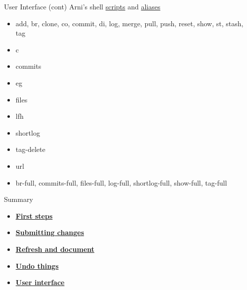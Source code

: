 \documentclass[aspectratio=169]{beamer}
\begin{document}
\begin{frame}{User Interface (cont)}\small
  Arni's shell {\blue\href{https://github.com/arni-magnusson/bin}{scripts}} and
  {\blue
    \href{https://github.com/arni-magnusson/dot/blob/master/.bashrc}{aliases}}
  \begin{itemize}\fns
    \item[] add, br, clone, co, commit, di, log, merge, pull, push, reset, show,
    st, stash, tag 
    \item[] c 
    \item[] commits 
    \item[] eg 
    \item[] files 
    \item[] lfh 
    \item[] shortlog 
    \item[] tag-delete 
    \item[] url 
    \item[] br-full, commits-full, files-full, log-full, shortlog-full,
    show-full, tag-full
  \end{itemize}
\end{frame}


\begin{frame}{Summary}
  \begin{itemize}
    \item[] \hyperlink{first}{\bf\darkblue First steps}
    \\[4ex]
    \item[] \hyperlink{submit}{\bf\darkblue Submitting changes} \\[4ex]
    \item[] \hyperlink{refresh}{\bf\darkblue Refresh and document}
    \\[4ex]
    \item[] \hyperlink{undo}{\bf\darkblue Undo things} \\[4ex]
    \item[] \hyperlink{ui}{\bf\darkblue User interface}
    \\[1ex]
  \end{itemize}
\end{frame}
\end{document}
